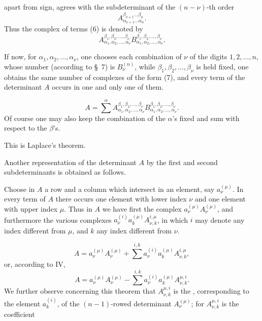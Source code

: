 
apart from sign, agrees with the subdeterminant of the \((n-\nu)\)-th order
\[
        A_{\alpha_{\nu+1}\ldots\alpha_n}^{\beta_{\nu+1}\ldots\beta_n}.
\]
Thus the complex of terms (6) is denoted by
\begin{equation}
        A_{\alpha_1,\alpha_2,\ldots,\alpha_\nu}^{\beta_1,\beta_2,\ldots,\beta_\nu}
        B_{\alpha_1,\alpha_2,\ldots,\alpha_\nu}^{\beta_1,\beta_2,\ldots,\beta_\nu}.
\tag{7}
\end{equation}

If now, for \(\alpha_1,\alpha_2,\ldots,\alpha_\nu\), one chooses each combination of \(\nu\) of the digits \(1,2,\ldots,n\), whose number (according to \S~7) is \(B_\nu^{(n)}\), while \(\beta_1,\beta_2,\ldots,\beta_\nu\) is held fixed, one obtains the same number of complexes of the form (7), and every term of the determinant \(A\) occurs in one and only one of them.

\begin{equation}
        A=\sum^{\alpha}
        A_{\alpha_1,\alpha_2,\ldots,\alpha_\nu}^{\beta_1,\beta_2,\ldots,\beta_\nu}
        B_{\alpha_1,\alpha_2,\ldots,\alpha_\nu}^{\beta_1,\beta_2,\ldots,\beta_\nu}.
\tag{8}
\end{equation}
Of course one may also keep the combination of the \(\alpha\)'s fixed and sum with respect to the \(\beta\)'s.

This is Laplace's theorem.

Another representation of the determinant \(A\) by the first and second subdeterminants is obtained as follows.

Choose in \(A\) a row and a column which intersect in an element, say \(a_\nu^{(\mu)}\). In every term of \(A\) there occurs one element with lower index \(\nu\) and one element with upper index \(\mu\). Thus in \(A\) we have first the complex \(a_\nu^{(\mu)}A_\nu^{(\mu)}\), and furthermore the various complexes \(a_\nu^{(i)}a_k^{(\mu)}A_{\nu,k}^{i,\mu}\), in which \(i\) may denote any index different from \(\mu\), and \(k\) any index different from \(\nu\).

\begin{equation}
        A=a_\nu^{(\mu)}A_\nu^{(\mu)}+
        \sum^{i,k} a_\nu^{(i)}a_k^{(\mu)}A_{\nu,k}^{i,\mu},
\tag{9}
\end{equation}
or, according to IV,
\begin{equation}
        A=a_\nu^{(\mu)}A_\nu^{(\mu)}-
        \sum^{i,k} a_\nu^{(i)}a_k^{(\mu)}A_{\nu,k}^{\mu,i}.
\tag{10}
\end{equation}
We further observe concerning this theorem that \(A_{\nu,k}^{\mu,i}\) is the , corresponding to the element \(a_k^{(i)}\), of the \((n-1)\)-rowed determinant \(A_\nu^{(\mu)}\); for \(A_{\nu,k}^{\mu,i}\) is the coefficient
